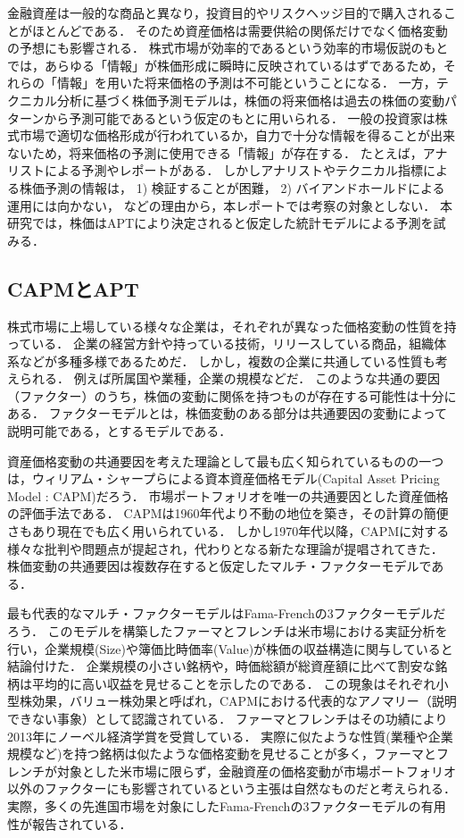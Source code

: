 ﻿\documentclass[a4paper]{jarticle}
\begin{document}
金融資産は一般的な商品と異なり，投資目的やリスクヘッジ目的で購入されることがほとんどである．
そのため資産価格は需要供給の関係だけでなく価格変動の予想にも影響される．
株式市場が効率的であるという効率的市場仮説のもとでは，あらゆる「情報」が株価形成に瞬時に反映されているはずであるため，それらの「情報」を用いた将来価格の予測は不可能ということになる．
一方，テクニカル分析に基づく株価予測モデルは，株価の将来価格は過去の株価の変動パターンから予測可能であるという仮定のもとに用いられる．
一般の投資家は株式市場で適切な価格形成が行われているか，自力で十分な情報を得ることが出来ないため，将来価格の予測に使用できる「情報」が存在する．
たとえば，アナリストによる予測やレポートがある．
しかしアナリストやテクニカル指標による株価予測の情報は，
1) 検証することが困難，
2) バイアンドホールドによる運用には向かない，
などの理由から，本レポートでは考察の対象としない．
本研究では，株価はAPTにより決定されると仮定した統計モデルによる予測を試みる．

\subsection{CAPMとAPT}
株式市場に上場している様々な企業は，それぞれが異なった価格変動の性質を持っている．
企業の経営方針や持っている技術，リリースしている商品，組織体系などが多種多様であるためだ．
しかし，複数の企業に共通している性質も考えられる．
例えば所属国や業種，企業の規模などだ．
このような共通の要因（ファクター）のうち，株価の変動に関係を持つものが存在する可能性は十分にある．
ファクターモデルとは，株価変動のある部分は共通要因の変動によって説明可能である，とするモデルである．

資産価格変動の共通要因を考えた理論として最も広く知られているものの一つは，ウィリアム・シャープらによる資本資産価格モデル(Capital Asset Pricing Model : CAPM)だろう．
市場ポートフォリオを唯一の共通要因とした資産価格の評価手法である．
CAPMは1960年代より不動の地位を築き，その計算の簡便さもあり現在でも広く用いられている．
しかし1970年代以降，CAPMに対する様々な批判や問題点が提起され，代わりとなる新たな理論が提唱されてきた．
株価変動の共通要因は複数存在すると仮定したマルチ・ファクターモデルである．


最も代表的なマルチ・ファクターモデルはFama-Frenchの3ファクターモデル\cite{Fama}だろう．
このモデルを構築したファーマとフレンチは米市場における実証分析を行い，企業規模(Size)や簿価比時価率(Value)が株価の収益構造に関与していると結論付けた．
企業規模の小さい銘柄や，時価総額が総資産額に比べて割安な銘柄は平均的に高い収益を見せることを示したのである．
この現象はそれぞれ小型株効果，バリュー株効果と呼ばれ，CAPMにおける代表的なアノマリー（説明できない事象）として認識されている．
ファーマとフレンチはその功績により2013年にノーベル経済学賞を受賞している．
実際に似たような性質(業種や企業規模など)を持つ銘柄は似たような価格変動を見せることが多く，ファーマとフレンチが対象とした米市場に限らず，金融資産の価格変動が市場ポートフォリオ以外のファクターにも影響されているという主張は自然なものだと考えられる．
実際，多くの先進国市場を対象にしたFama-Frenchの3ファクターモデルの有用性が報告されている．
\end{document}

